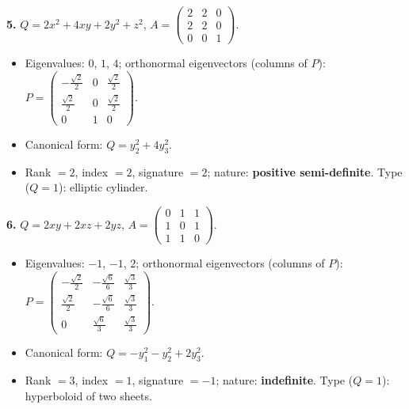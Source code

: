\noindent\textbf{5.} $Q=2 x^{2} + 4 x y + 2 y^{2} + z^{2}$, $A=\begin{pmatrix}2 & 2 & 0 \\ 2 & 2 & 0 \\ 0 & 0 & 1\end{pmatrix}$.
\begin{itemize}\item Eigenvalues: $0$, $1$, $4$; orthonormal eigenvectors (columns of $P$): $P=\begin{pmatrix}- \frac{\sqrt{2}}{2} & 0 & \frac{\sqrt{2}}{2} \\ \frac{\sqrt{2}}{2} & 0 & \frac{\sqrt{2}}{2} \\ 0 & 1 & 0\end{pmatrix}$.
\item Canonical form: $Q=y_{2}^{2} + 4 y_{3}^{2}$.
\item Rank $=2$, index $=2$, signature $=2$; nature: \textbf{positive semi-definite}. Type ($Q=1$): elliptic cylinder.\end{itemize}

\noindent\textbf{6.} $Q=2 x y + 2 x z + 2 y z$, $A=\begin{pmatrix}0 & 1 & 1 \\ 1 & 0 & 1 \\ 1 & 1 & 0\end{pmatrix}$.
\begin{itemize}\item Eigenvalues: $-1$, $-1$, $2$; orthonormal eigenvectors (columns of $P$): $P=\begin{pmatrix}- \frac{\sqrt{2}}{2} & - \frac{\sqrt{6}}{6} & \frac{\sqrt{3}}{3} \\ \frac{\sqrt{2}}{2} & - \frac{\sqrt{6}}{6} & \frac{\sqrt{3}}{3} \\ 0 & \frac{\sqrt{6}}{3} & \frac{\sqrt{3}}{3}\end{pmatrix}$.
\item Canonical form: $Q=- y_{1}^{2} - y_{2}^{2} + 2 y_{3}^{2}$.
\item Rank $=3$, index $=1$, signature $=-1$; nature: \textbf{indefinite}. Type ($Q=1$): hyperboloid of two sheets.\end{itemize}

